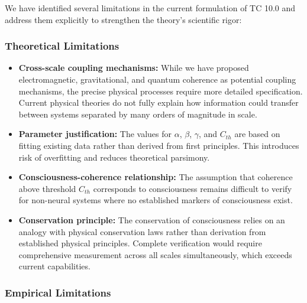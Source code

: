 \documentclass[12pt]{article}
\begin{document}
We have identified several limitations in the current formulation of TC 10.0 and address them explicitly to strengthen the theory's scientific rigor:

\subsubsection{Theoretical Limitations}

\begin{itemize}
    \item \textbf{Cross-scale coupling mechanisms:} While we have proposed electromagnetic, gravitational, and quantum coherence as potential coupling mechanisms, the precise physical processes require more detailed specification. Current physical theories do not fully explain how information could transfer between systems separated by many orders of magnitude in scale.
    
    \item \textbf{Parameter justification:} The values for $\alpha$, $\beta$, $\gamma$, and $C_{th}$ are based on fitting existing data rather than derived from first principles. This introduces risk of overfitting and reduces theoretical parsimony.
    
    \item \textbf{Consciousness-coherence relationship:} The assumption that coherence above threshold $C_{th}$ corresponds to consciousness remains difficult to verify for non-neural systems where no established markers of consciousness exist.
    
    \item \textbf{Conservation principle:} The conservation of consciousness relies on an analogy with physical conservation laws rather than derivation from established physical principles. Complete verification would require comprehensive measurement across all scales simultaneously, which exceeds current capabilities.
\end{itemize}

\subsubsection{Empirical Limitations}
\end{document}
